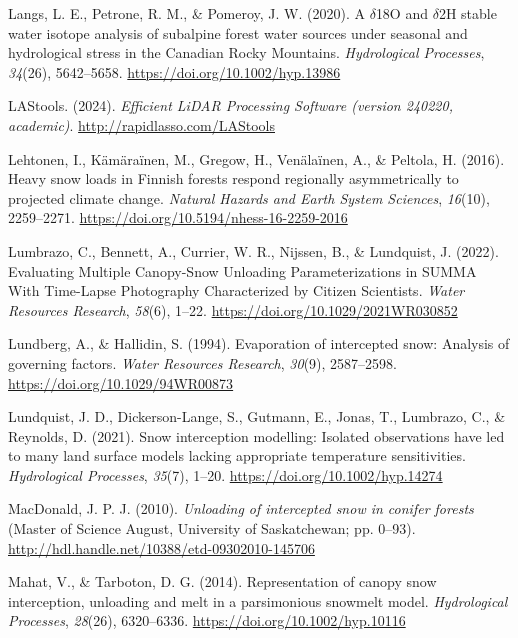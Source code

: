 \documentclass[
  letterpaper,
  DIV=11,
  numbers=noendperiod]{scrartcl}
\newlength{\cslhangindent}
\newenvironment{CSLReferences}[2] %
 {\begin{list}{}{%
  \setlength{\itemindent}{0pt}
  \setlength{\leftmargin}{0pt}
  \setlength{\parsep}{0pt}
  \ifodd #1
   \setlength{\leftmargin}{\cslhangindent}
   \setlength{\itemindent}{-1\cslhangindent}
  \fi
  \setlength{\itemsep}{#2\baselineskip}}}
 {\end{list}}
\begin{document}
\begin{CSLReferences}{1}{0}
Langs, L. E., Petrone, R. M., \& Pomeroy, J. W. (2020). {A \(\delta\)18O
and \(\delta\)2H stable water isotope analysis of subalpine forest water
sources under seasonal and hydrological stress in the Canadian Rocky
Mountains}. \emph{Hydrological Processes}, \emph{34}(26), 5642--5658.
\url{https://doi.org/10.1002/hyp.13986}

LAStools. (2024). \emph{{Efficient LiDAR Processing Software (version
240220, academic)}}. \url{http://rapidlasso.com/LAStools}

Lehtonen, I., Kämäraïnen, M., Gregow, H., Venälaïnen, A., \& Peltola, H.
(2016). {Heavy snow loads in Finnish forests respond regionally
asymmetrically to projected climate change}. \emph{Natural Hazards and
Earth System Sciences}, \emph{16}(10), 2259--2271.
\url{https://doi.org/10.5194/nhess-16-2259-2016}

Lumbrazo, C., Bennett, A., Currier, W. R., Nijssen, B., \& Lundquist, J.
(2022). {Evaluating Multiple Canopy-Snow Unloading Parameterizations in
SUMMA With Time-Lapse Photography Characterized by Citizen Scientists}.
\emph{Water Resources Research}, \emph{58}(6), 1--22.
\url{https://doi.org/10.1029/2021WR030852}

Lundberg, A., \& Hallidin, S. (1994). {Evaporation of intercepted snow:
Analysis of governing factors}. \emph{Water Resources Research},
\emph{30}(9), 2587--2598. \url{https://doi.org/10.1029/94WR00873}

Lundquist, J. D., Dickerson-Lange, S., Gutmann, E., Jonas, T., Lumbrazo,
C., \& Reynolds, D. (2021). {Snow interception modelling: Isolated
observations have led to many land surface models lacking appropriate
temperature sensitivities}. \emph{Hydrological Processes}, \emph{35}(7),
1--20. \url{https://doi.org/10.1002/hyp.14274}

MacDonald, J. P. J. (2010). \emph{{Unloading of intercepted snow in
conifer forests}} (Master of Science August, University of Saskatchewan;
pp. 0--93). \url{http://hdl.handle.net/10388/etd-09302010-145706}

Mahat, V., \& Tarboton, D. G. (2014). {Representation of canopy snow
interception, unloading and melt in a parsimonious snowmelt model}.
\emph{Hydrological Processes}, \emph{28}(26), 6320--6336.
\url{https://doi.org/10.1002/hyp.10116}


\end{CSLReferences}
\end{document}
